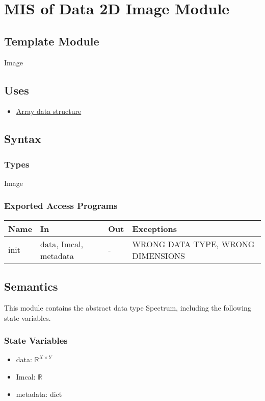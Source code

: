 \documentclass[12pt, titlepage]{article}
\begin{document}
\section{MIS of Data 2D Image Module} \label{Mod:Image}

\subsection{Template Module}
Image

\subsection{Uses}
\begin{itemize}
    \item \hyperref[Mod:Array]{Array data structure}
\end{itemize}

\subsection{Syntax}
\subsubsection{Types}
Image

\subsubsection{Exported Access Programs}

\begin{center}
    \begin{tabular}{p{1.5cm} p{4cm} p{4cm} p{4cm}}
        \toprule
        \textbf{Name} & \textbf{In} & \textbf{Out} & \textbf{Exceptions} \\
        \midrule
        init & data, Imcal, metadata & - & WRONG DATA TYPE, WRONG DIMENSIONS \\
        \bottomrule
    \end{tabular}
\end{center}

\subsection{Semantics}
This module contains the abstract data type Spectrum, including the following
state variables.
\subsubsection{State Variables}
\begin{itemize}
    \item data: $\mathbb{R}^{X \times Y}$
    \item Imcal: $\mathbb{R}$
    \item metadata: dict
\end{itemize}
\end{document}
